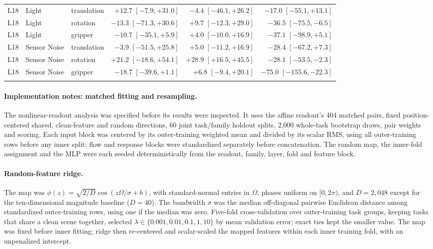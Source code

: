 \begin{table}[t]
\begin{tabular}{@{}lllrrr@{}}
L18 & Light & translation & $+12.7$ $[-7.9,+31.0]$ & $-4.4$ $[-46.1,+26.2]$ & $-17.0$ $[-55.1,+13.1]$\\
L18 & Light & rotation & $-13.3$ $[-71.3,+30.6]$ & $+9.7$ $[-12.3,+29.0]$ & $-36.5$ $[-75.5,-6.5]$\\
L18 & Light & gripper & $-10.7$ $[-35.1,+5.9]$ & $+4.0$ $[-10.0,+16.9]$ & $-37.1$ $[-98.9,+5.1]$\\
L18 & Sensor Noise & translation & $-3.9$ $[-51.5,+25.8]$ & $+5.0$ $[-11.2,+16.9]$ & $-28.4$ $[-67.2,+7.3]$\\
L18 & Sensor Noise & rotation & $+21.2$ $[-18.6,+54.1]$ & $+28.9$ $[+16.5,+45.5]$ & $-28.1$ $[-53.5,-2.3]$\\
L18 & Sensor Noise & gripper & $-18.7$ $[-39.6,+1.1]$ & $+6.8$ $[-9.4,+20.1]$ & $-75.0$ $[-155.6,-22.3]$\\\\\bottomrule
\end{tabular}
\end{table}

\paragraph{Implementation notes: matched fitting and resampling.}
The nonlinear-readout analysis was specified before its results were inspected. It uses the affine readout's 404 matched pairs, fixed position-centered shared, clean-feature and random directions, 60 joint task/family holdout splits, 2{,}000 whole-task bootstrap draws, pair weights and scoring.
Each input block was centered by its outer-training weighted mean and divided by its scalar RMS, using all outer-training rows before any inner split; flow and response blocks were standardized separately before concatenation.
The random map, the inner-fold assignment and the MLP were each seeded deterministically from the readout, family, layer, fold and feature block.

\paragraph{Random-feature ridge.}
The map was $\phi(z)=\sqrt{2/D}\cos(z\Omega/\sigma+b)$, with standard-normal entries in $\Omega$, phases uniform on $[0,2\pi)$, and $D=2{,}048$ except for the ten-dimensional magnitude baseline ($D=40$).
The bandwidth $\sigma$ was the median off-diagonal pairwise Euclidean distance among standardized outer-training rows, using one if the median was zero.
Five-fold cross-validation over outer-training task groups, keeping tasks that share a clean scene together, selected $\lambda\in\{0.001,0.01,0.1,1,10\}$ by mean validation error; exact ties kept the smaller value.
The map was fixed before inner fitting; ridge then re-centered and scalar-scaled the mapped features within each inner training fold, with an unpenalized intercept.

